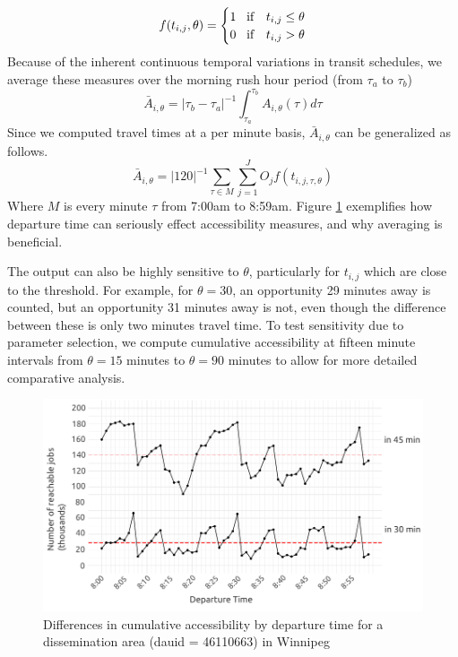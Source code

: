\documentclass[11 pt, letterpaper]{article}
\begin{document}
{\begin{equation}
f(t_{i,j},\theta) = 
\begin{cases} 
1 \hspace{3mm} \text{if} & t_{i,j} \leq \theta \\
0 \hspace{3mm} \text{if}  & t_{i,j} > \theta
\end{cases}
\end{equation}
Because of the inherent continuous temporal variations in transit schedules, we average these measures over the morning rush hour period (from $\tau_a$ to $\tau_b$)
\begin{equation}
\bar{A}_{i,\theta} = |\tau_b - \tau_a|^{-1} \int_{\tau_a}^{\tau_b} A_{i,\theta} (\tau) d\tau
\end{equation}
Since we computed travel times at a per minute basis, $\bar{A}_{i,\theta}$ can be generalized as follows.
\begin{equation}
\bar{A}_{i,\theta} = |120|^{-1} \sum_{\tau \in M} \sum_{j = 1}^{J} O_j f(t_{i,j,\tau,\theta})
\end{equation}
Where $M$ is every minute $\tau$ from 7:00am to 8:59am. Figure \ref{cumacc_time} exemplifies how departure time can seriously effect accessibility measures, and why averaging is beneficial.

The output can also be highly sensitive to $\theta$, particularly for $t_{i,j}$ which are close to the threshold. For example, for $\theta = 30$, an opportunity 29 minutes away is counted, but an opportunity 31 minutes away is not, even though the difference between these is only two minutes travel time. To test sensitivity due to parameter selection, we compute cumulative accessibility at fifteen minute intervals from $\theta = 15$ minutes to $\theta = 90$ minutes to allow for more detailed comparative analysis.


\vspace{4mm}
\begin{figure}[H]
	\caption{Differences in cumulative accessibility by departure time for a dissemination area (dauid = 46110663) in Winnipeg} 
	\label{cumacc_time}
	\centerline{\includegraphics[width=6in]{figures/time_cumulaccess/time_cumacc.pdf}}
	\vspace{2mm}
\end{figure}





}
\end{document}
